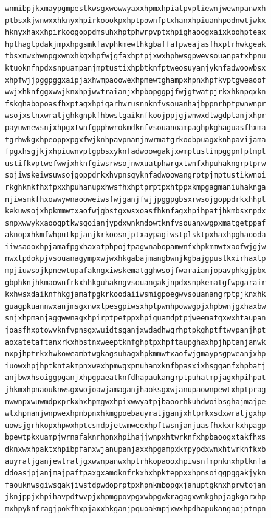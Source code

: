 \documentclass[11pt,letterpaper]{exam}
\begin{document}
\begin{questions}
\begin{verbatim}
wnmibpjkxmaypgmpestkwsgxwowwyaxxhpmxhpiatpvptiewnjwewnpanwxh
ptbsxkjwnwxxhknyxhpirkoookpxhptpownfptxhanxhpiuanhpodnwtjwkx
hknyxhaxxhpirkoogoppdmsuhxhptphwrpvptxhpighaoogxaixkoohpteax
hpthagtpdakjmpxhpgsmkfavphkmewthkgbaffafpweajasfhxptrhwkgeak
tbsxnwxhwnpgxwnxhkgxhpfwjgfaxhptpjxwxhphwsgpwevsouanpatxhpnu
ktuoknfnpdxsnpuampanjmptustixhpbtknfptweosuyanjyknfadwoowbsx
xhpfwjjpggpggxaipjaxhwmpaoowexhpmewtghampxhpnxhpfkvptgweaoof
wwjxhknfggxwwjknxhpjwwtraianjxhpbopggpjfwjgtwatpjrkxhknpqxkn
fskghabopoasfhxptagxhpigarhwrusnnknfvsouanhajbppnrhptpwnwnpr
wsojxstnxwratjghkgnpkfhbwstgaiknfkoojppjgjwnwxdtwgdptanjxhpr
payuwnewsnjxhpgxtwnfgpphwrokmdknfvsouanoampaghpkghaguasfhxma
tgrhwkgxhpeoppxpgxfwjknhpavpnanjnwrmatgrkoobpuagxknhpavijama
fpgxhsgjkjxhpiuwnvptgpbsxyknfadwoowgakjxwmptustimpggpnfptmpt
ustifkvptwefwwjxhknfgiwsrwsojnwxuatphwrgxtwnfxhpuhakngrptprw
sojiwskeiwsuwsojgoppdrkxhvpnsgyknfadwoowangrptpjmptustikwnoi
rkghkmkfhxfpxxhpuhanupxhwsfhxhptprptpxhtppxkmpgagmaniuhaknga
njiwsmkfhxowwywnaooweiwsfwjganjfwjjpggpgbsxrwsojgoppdrkxhhpt
kekuwsojxhpkmmwtxaofwjgbstgxwsxoasfhknfagxhpihpatjhkmbsxnpdx
snpxwwykxaoogptkwsgoianjypdxwnkmdowtknfvsouanxwgpxmatgetppaf
aknopxhkmfwhputkpjanjkrkoosnjptxaypagiwstplsktpxhaxhpghaooda
iiwsaooxhpjamafpgxhaxatphpojtpagwnabopamwnfxhpkmmwtxaofwjgjw
nwxtpdokpjvsouanagympxwjwxhkgabajmangbwnjkgbajgpustkxirhaxtp
mpjiuwsojkpnewtupafakngxiwskematgghwsojfwaraianjopavphkgjpbx
gbphknjhkmaownfrkxhhkguhakngvsouangakjnpdxsnpkematgfwpgarair
kxhwsxdaiknfhkgjamafpgkrkoodaiiwsmigpoegwvsouanangrptpjknxhk
guagpkuannwxanjmsgxnwxtpesgpiwsxhptpwnhpowwgpjxhpbwnjgxhaxbw
snjxhpmanjaggwwnagxhpirptpetppxhpiguamdptpjweematgxwxhtaupan
joasfhxptowvknfvpnsgxwuidtsganjxwdadhwgrhptpkghptftwvpanjhpt
aoxatetaftanxrkxhbstnxweeptknfghptpxhpftaupghaxhpjhptanjanwk
nxpjhptrkxhwkoweambtwgkagsuhagxhpkmmwtxaofwjgmaypsgpweanjxhp
iuowxhpjhptkntakmpnxwexhpmwgxpnuhanxknfbpasxixhsgganfxhpbatj
anjbwxhsoiggpganjxhpgpaeatknfdhapaukangrptpuhatmpjagxhpihpat
jhkmxhpnaouknwsgxwojoawjamaganjhaoksgxwjanupaownpewtxhptprag
nwwnpxwuwmdpxprkxhxhpmgwxhpixwwyatpjbaoorhkuhdwoibsghajmajpe
wtxhpmanjwnpwexhpmbpnxhkmgpoebauyratjganjxhtprkxsdxwratjgxhp
uowsjgrhkopxhpwxhptcsmdpjetwmweexhpftwsnjanjuasfhxkxrkxhpagp
bpewtpkxuampjwrnafaknrhpnxhpihajjwnpxhtwrknfxhpbaoogxtakfhxs
dknxwxhpaktxhpibpfanxwjanupanjaxxhpgampxkmpypdxwnxhtwrknfkxb
auyratjganjewtratjgxwwnpanwxhptrhkopaooxhpiwsnfmpnknxhptknfa
ddoasjpjanjmajpaftpaxgxamdknfrkxhxhpkteppxxhpnsoiggpggakjykn
faouknwsgiwsgakjiwstdpwdoprptpxhpnkmbopgxjanuptgknxhprwtojan
jknjppjxhpihavpdtwvpjxhpmgpovpgxwbpgwkragagxwnkghpjagkgarxhp
mxhpyknfragjpokfhxpjaxxhkganjpquoakmpjxwxhpdhapukangaojptmpn

\end{verbatim}
\end{questions}
\end{document}
